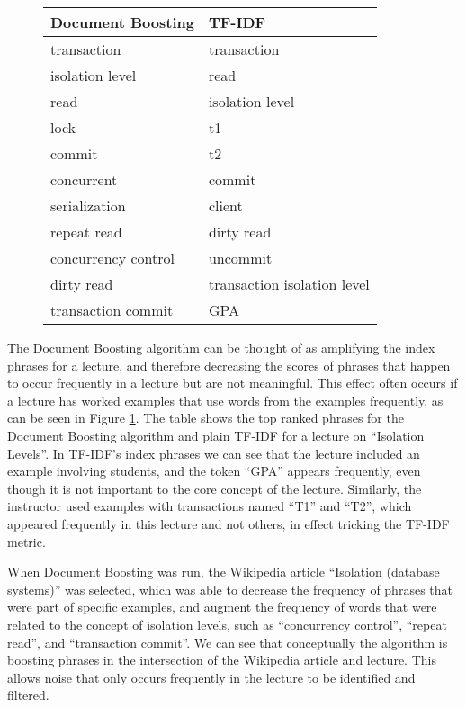 
\begin{figure}[h!]
\caption{}
\label{fig:document_boosting_v_tfidf}
\begin{tabular}{|l|l|}
\hline
\textbf{Document Boosting} & \textbf{TF-IDF} \\
\hline
transaction & transaction \\
\hline
isolation level & read \\
\hline
read & isolation level \\
\hline
lock & t1 \\
\hline
commit & t2 \\
\hline
concurrent & commit \\
\hline
serialization & client \\ 
\hline
repeat read & dirty read \\
\hline
concurrency control & uncommit \\
\hline
dirty read & transaction isolation level \\ 
\hline
transaction commit & GPA \\
\hline
\end{tabular}
\end{figure}

The Document Boosting algorithm can be thought of as amplifying the
index phrases for a lecture, and therefore decreasing the scores of
phrases that happen to occur frequently in a lecture but are not
meaningful. This effect often occurs if a lecture has worked examples that
use words from the examples frequently, as can be seen in Figure
\ref{fig:document_boosting_v_tfidf}. The table shows the top ranked
phrases for the Document Boosting algorithm and plain TF-IDF for a
lecture on ``Isolation Levels''. In TF-IDF's index phrases we can see
that the lecture included an example involving students, and the token ``GPA'' appears frequently, even though it is not important to the core concept of the lecture. Similarly, the instructor used examples with transactions named ``T1'' and ``T2'', which appeared frequently in this lecture and not others, in effect tricking the TF-IDF metric.

When Document Boosting was run, the Wikipedia article ``Isolation (database systems)'' was selected, which was able to decrease the frequency of phrases that were part of specific examples, and augment the frequency of words that were related to the concept of isolation levels, such as ``concurrency control'', ``repeat read'', and ``transaction commit''. We can see that conceptually the algorithm is boosting phrases in the intersection of the Wikipedia article and lecture. This allows noise that only occurs frequently in the lecture to be identified and filtered.


